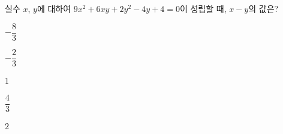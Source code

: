 실수 $x$, $y$에 대하여 $9x^2+6xy+2y^2-4y+4=0$이 성립할 때, $x-y$의 값은?
\begin{choices32}{\rule[-3ex]{0pt}{8ex}$-\dfrac{8}{3}$}{\rule[-3ex]{0pt}{8ex}$-\dfrac{2}{3}$}{\rule[-3ex]{0pt}{8ex}$1$}{\rule[-3ex]{0pt}{8ex}$\dfrac{4}{3}$}{\rule[-3ex]{0pt}{8ex}$2$}\end{choices32}
